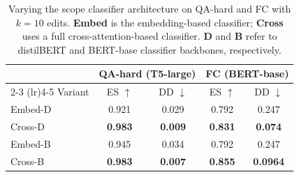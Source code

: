 \begin{table}
    \centering
    \small
    \begin{tabular}{lcccc}
        \toprule
        & \multicolumn{2}{c}{\textbf{QA-hard} (T5-large)} & \multicolumn{2}{c}{\textbf{FC} (BERT-base)} \\
        \cmidrule(lr){2-3} \cmidrule(lr){4-5}
        Variant & ES $\uparrow$ & DD $\downarrow$ & ES $\uparrow$ & DD $\downarrow$ \\
        \midrule
        Embed-D & 0.921 & 0.029 & 0.792 & 0.247 \\
        Cross-D & \textbf{0.983} & \textbf{0.009} & \textbf{0.831} & \textbf{0.074} \\
        Embed-B & 0.945 & 0.034 & 0.792 & 0.247 \\
        Cross-B & \textbf{0.983} & \textbf{0.007} & \textbf{0.855} & \textbf{0.0964} \\
        \bottomrule
    \end{tabular}
    \caption{Varying the scope classifier architecture on QA-hard and FC with $k=10$ edits. \textbf{Embed} is the embedding-based classifier; \textbf{Cross} uses a full cross-attention-based classifier. \textbf{D} and \textbf{B} refer to distilBERT and BERT-base classifier backbones, respectively.}
    \label{tab:cls_arch}
\end{table}
